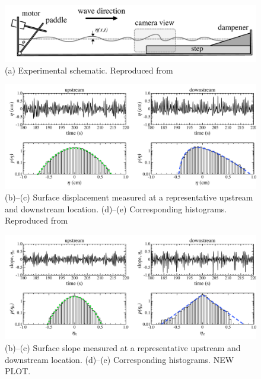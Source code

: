 \documentclass[11pt]{article}
\begin{document}
\begin{figure}%
\begin{center}
\includegraphics[width = 0.85 \linewidth]{Figs/fig1.pdf}
\caption{
(a) Experimental schematic. Reproduced from \cite{bolles2019anomalous}
}
\label{fig1}
\end{center}
\end{figure}

\begin{figure}%
\begin{center}
\includegraphics[width = 0.85 \linewidth]{Figs/fig2.pdf}
\caption{
(b)--(c) Surface displacement measured at a representative upstream and downstream location. (d)--(e) Corresponding histograms. Reproduced from \cite{bolles2019anomalous}
}
\label{fig1}
\end{center}
\end{figure}
 
\begin{figure}%
\begin{center}
\includegraphics[width = 0.85 \linewidth]{Figs/fig3.pdf}
\caption{
(b)--(c) Surface slope measured at a representative upstream and downstream location. (d)--(e) Corresponding histograms. NEW PLOT.
}
\label{fig1}
\end{center}
\end{figure}
 
\end{document}
